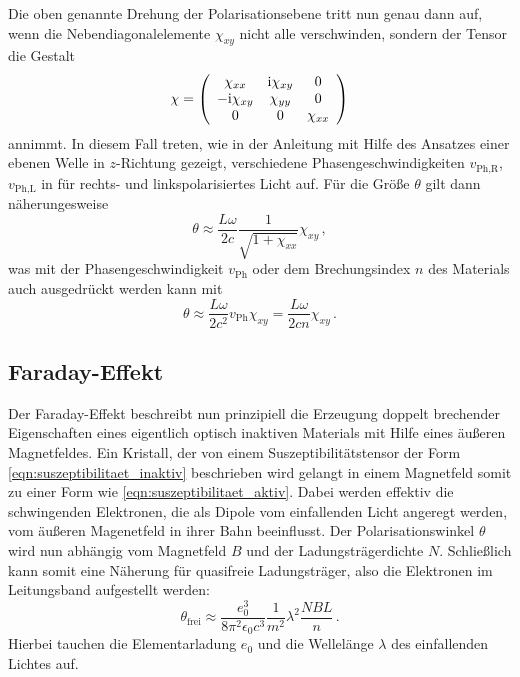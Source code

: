 Die oben genannte Drehung der Polarisationsebene tritt nun genau dann auf, wenn
die Nebendiagonalelemente $\chi_{xy}$ nicht alle verschwinden, sondern der
Tensor die Gestalt
\begin{equation}
    \label{eqn:suszeptibilitaet_aktiv}
    \mathbf{\chi} =
    \left(\begin{array}{ccc}
        \chi_{xx}    & \mathrm{i}\chi_{xy} & 0 \\
        -\mathrm{i}\chi_{xy} & \chi_{yy}   & 0 \\
        0            & 0           & \chi_{xx} \\
    \end{array}\right)
\end{equation}
annimmt. In diesem Fall treten, wie in der Anleitung \cite{V46} mit Hilfe
des Ansatzes einer ebenen Welle in $z$-Richtung gezeigt, verschiedene
Phasengeschwindigkeiten $v_\text{Ph,R}$, $v_\text{Ph,L}$ in für rechts- und
linkspolarisiertes Licht auf.
Für die Größe $\theta$ gilt dann näherungesweise
\begin{equation}
    \label{eqn:theta_cirkular}
    \theta \approx \frac{L\omega}{2c}\frac{1}{\sqrt{1+\chi_{xx}}}\chi_{xy}\,,
\end{equation}
was mit der Phasengeschwindigkeit $v_\text{Ph}$ oder dem Brechungsindex $n$
des Materials auch ausgedrückt werden kann mit
\begin{equation}
    \label{eqn:theta_n}
    \theta
    \approx \frac{L\omega}{2c^2}v_\text{Ph}\chi_{xy}
    = \frac{L\omega}{2cn}\chi_{xy}\,.
\end{equation}

\subsection{Faraday-Effekt} %
\label{sub:faraday_effekt}
Der Faraday-Effekt beschreibt nun prinzipiell die Erzeugung doppelt brechender
Eigenschaften eines eigentlich optisch inaktiven Materials mit Hilfe eines
äußeren Magnetfeldes.
Ein Kristall, der von einem Suszeptibilitätstensor der Form
\eqref{eqn:suszeptibilitaet_inaktiv} beschrieben wird gelangt in einem
Magnetfeld somit zu einer Form wie \eqref{eqn:suszeptibilitaet_aktiv}.
Dabei werden effektiv die schwingenden Elektronen, die als Dipole vom
einfallenden Licht angeregt werden, vom äußeren Magenetfeld in ihrer
Bahn beeinflusst.
Der Polarisationswinkel $\theta$ wird nun abhängig vom Magnetfeld
$B$ und der Ladungsträgerdichte $N$.
Schließlich kann somit eine Näherung für quasifreie Ladungsträger,
also die Elektronen im Leitungsband aufgestellt werden:
\begin{equation}
    \label{eqn:theta_final}
    \theta_\text{frei}
    \approx \frac{e_0^3}{8\pi^2\epsilon_0 c^3}
    \frac{1}{m^2}\lambda^2 \frac{NBL}{n}\,.
\end{equation}
Hierbei tauchen die Elementarladung $e_0$ und die Wellelänge $\lambda$ des
einfallenden Lichtes auf.

